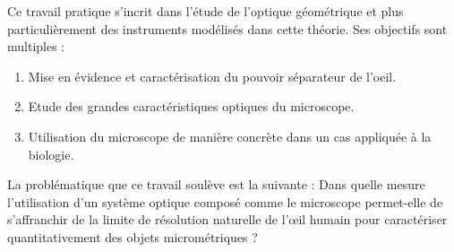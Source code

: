 Ce travail pratique s'incrit dans l'étude de l'optique géométrique 
et plus particulièrement des instruments modélisés dans cette théorie. 
Ses objectifs sont multiples : 
\begin{enumerate}
    \item Mise en évidence et caractérisation du pouvoir séparateur de l'oeil.
    \item Etude des grandes caractéristiques optiques du microscope.
    \item Utilisation du microscope de manière concrète dans un cas appliquée à la biologie.
\end{enumerate}
La problématique que ce travail soulève est la suivante : 
Dans quelle mesure l'utilisation d'un système optique composé comme le microscope 
permet-elle de s'affranchir de la limite de résolution naturelle de l'œil humain 
pour caractériser quantitativement des objets micrométriques ?